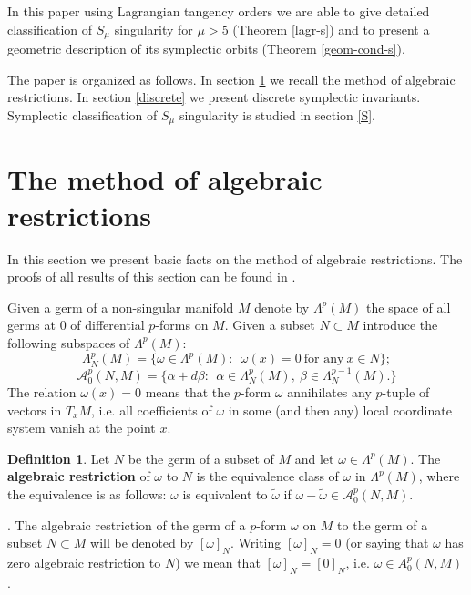 \documentclass{amsart}
\theoremstyle{definition}
\newtheorem{defn}[thm]{Definition}
\numberwithin{equation}{section}
\begin{document}
In this paper using Lagrangian tangency orders we are able to give
detailed classification of $S_{\mu}$
 singularity for $\mu>5$ (Theorem \ref{lagr-s}) and to present a
geometric description of its symplectic orbits (Theorem
\ref{geom-cond-s}).

The paper is organized as follows. In section \ref{method} we recall the method of algebraic restrictions.
In section \ref{discrete} we present  discrete symplectic invariants.
Symplectic classification of $S_{\mu}$ singularity is studied in section \ref{S}.

\section{The method of algebraic restrictions}
\label{method}

In this section we present basic facts on the method of algebraic
restrictions. The proofs of all results of this section can be
found in \cite{DJZ2}.

  Given a germ of a non-singular manifold $M$
denote by $\Lambda ^p(M)$ the space of all germs at $0$ of
differential $p$-forms on $M$. Given a subset $N\subset M$
introduce the following subspaces of $\Lambda ^p(M)$:
$$\Lambda ^p_N(M) = \{\omega \in \Lambda ^p(M): \ \ \omega (x)=0 \ \text {for any} \ x\in N \};$$
$$\mathcal A^p_0(N, M) = \{\alpha  + d\beta : \ \ \alpha
\in \Lambda _N^p(M), \ \beta \in \Lambda _N^{p-1}(M).\}$$ The
relation $\omega (x)=0$ means that the $p$-form $\omega $
annihilates any $p$-tuple of vectors in $T_xM$, i.e. all
coefficients of $\omega $ in some (and then any) local coordinate
system vanish at the point $x$.

\smallskip

\begin{defn}
\label{main-def} Let $N$ be the germ of a subset of $M$ and let
$\omega \in \Lambda ^p(M)$. The {\bf algebraic restriction} of
$\omega $ to $N$ is the equivalence class of $\omega $ in $\Lambda
^p(M)$, where the equivalence is as follows: $\omega $ is
equivalent to $\widetilde \omega $ if $\omega - \widetilde \omega
\in \mathcal A^p_0(N, M)$.
\end{defn}

. The algebraic restriction of the germ of
a $p$-form $\omega $ on $M$ to the germ of a subset $N\subset M$
will be denoted by $[\omega ]_N$. Writing $[\omega ]_N=0$ (or
saying that $\omega $ has zero algebraic restriction to $N$) we
mean that $[\omega ]_N = [0]_N$, i.e. $\omega \in A^p_0(N, M)$.
\end{document}
